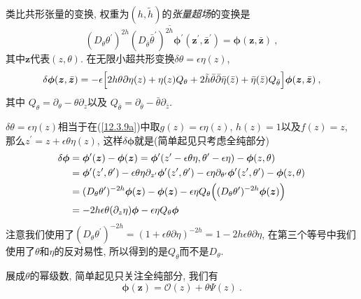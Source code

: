 类比共形张量的变换, 权重为$ (h,\tilde{h}) $的{\emph{张量超场}}的变换是
\begin{equation}
    (D_{\theta}\theta^{\prime})^{2h}(D_{\bar{\theta}}\bar{\theta}^{\prime})^{2\tilde{h}}
    \bm{\phi}^{\prime}(\bm{z}^{\prime},\bar{\bm{z}}^{\prime}) = \bm{\phi}(\bm{z},\bar{\bm{z}}) \:, \label{12.3.11}
\end{equation}
其中$ \bm{z} $代表$ (z,\theta)$. 在无限小超共形变换$ \delta \theta=\epsilon\eta(z)$,
\begin{equation}
    \delta\bm{\phi}(\bm{z},\bar{\bm{z}})=-\epsilon
    \Bigl[2h\theta\partial\eta(z)+\eta(z)Q_{\theta}+2\tilde{h}\bar{\theta}\bar{\partial}\bar{\eta}(\bar{z})
    +\bar{\eta}(\bar{z})Q_{\bar{\theta}}\Bigr]\bm{\phi}(\bm{z},\bar{\bm{z}}) \:, \label{12.3.12}
\end{equation}
其中 $Q_{\theta}=\partial_{\theta}-\theta\partial_{z} $以及%
$ Q_{\bar{\theta}}=\partial_{\bar{\theta}}-\bar{\theta}\partial_{\bar{z}}$.
\begin{tcolorbox}
$\delta\theta = \epsilon\eta(z) $相当于在(\ref{12.3.9a})中取$ g(z)=\epsilon\eta(z),\,h(z)=1 $以及$ f(z)=z $, 那么$ z^{\prime}=z+\epsilon\theta\eta(z)$, 这样$ \delta \bm{\phi} $就是(简单起见只考虑全纯部分)
\begin{align*}
    \delta\bm{\phi}&= \bm{\phi}^{\prime}(\bm{z})-\bm{\phi}(\bm{z}) = \bm{\phi}^{\prime}(z^{\prime}-\epsilon\theta\eta,\theta^{\prime}-\epsilon\eta)-\bm{\phi}(z,\theta) \\
    &=\bm{\phi}^{\prime}(z^{\prime},\theta^{\prime})
    -\epsilon\theta\eta\partial_{z^{\prime}}\bm{\phi}^{\prime}(z^{\prime},\theta^{\prime})
    -\epsilon\eta\partial_{\theta^{\prime}}\bm{\phi}^{\prime}(z^{\prime},\theta^{\prime}) -\bm{\phi}(z,\theta)\\
    &=(D_{\theta}\theta^{\prime})^{-2h}\bm{\phi}(\bm{z})-\bm{\phi}(\bm{z})
    -\epsilon\eta Q_{\theta}\Bigl((D_{\theta}\theta^{\prime})^{-2h}\bm{\phi}(\bm{z})\Bigr) \\
    &= -2h\epsilon\theta(\partial_{z}\eta) \bm{\phi} -\epsilon\eta Q_{\theta}\bm{\phi}
\end{align*}
注意我们使用了$ (D_{\theta}\theta^{\prime})^{-2h}=(1+\epsilon\theta\partial\eta)^{-2h}=1-2h\epsilon\theta\partial\eta$, 在第三个等号中我们使用了$ \theta $和$ \eta $的反对易性, 所以得到的是$ Q_{\theta} $而不是$ D_{\theta}$.
\end{tcolorbox}
展成$ \theta $的幂级数, 简单起见只关注全纯部分, 我们有
\begin{equation}
    \bm{\phi}(\bm{z}) = \mathcal{O}(z)+\theta \varPsi(z) \:. \label{12.3.13}
\end{equation}
